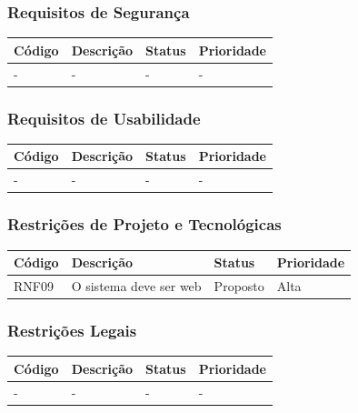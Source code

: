 \documentclass[a4paper, 12pt]{article}
\begin{document}
\subsubsection{Requisitos de Segurança}
\begin{table}[ht]
	\centering

	\begin{tabular}{p{2cm}p{7cm}p{2cm}p{2cm}}
		\hline
		\cellcolor{gray}Código&\cellcolor{gray}Descrição&\cellcolor{gray}Status&\cellcolor{gray}Prioridade  \\
		\hline
		-&-&-&-\\
		\hline
	\end{tabular}
\end{table}%
\subsubsection{Requisitos de Usabilidade}
\begin{table}[ht]
	\rowcolors{1}{}{}
	\centering

	\begin{tabular}{p{2cm}p{7cm}p{2cm}p{2cm}}
		\hline
		\cellcolor{gray}Código&\cellcolor{gray}Descrição&\cellcolor{gray}Status&\cellcolor{gray}Prioridade  \\
		\hline
		-&-&-&-\\
		\hline
	\end{tabular}
\end{table}%
\subsubsection{Restrições de Projeto e Tecnológicas}
\begin{table}[ht]
	\centering

	\begin{tabular}{p{2cm}p{7cm}p{2cm}p{2cm}}
		\hline
		\cellcolor{gray}Código&\cellcolor{gray}Descrição&\cellcolor{gray}Status&\cellcolor{gray}Prioridade  \\
		\hline
        RNF09&O sistema deve ser web&Proposto&Alta\\
		\hline
	\end{tabular}
\end{table}%
\newpage
\subsubsection{Restrições Legais}
\begin{table}[ht]
	\centering

	\begin{tabular}{p{2cm}p{7cm}p{2cm}p{2cm}}
		\hline
		\cellcolor{gray}Código&\cellcolor{gray}Descrição&\cellcolor{gray}Status&\cellcolor{gray}Prioridade  \\
		\hline
		-&-&-&-\\
		\hline
	\end{tabular}
\end{table}%
\end{document}
